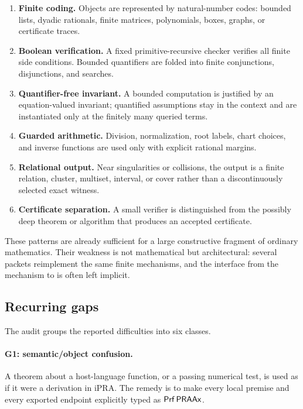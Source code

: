 \begin{enumerate}[label=\textbf{P\arabic*.}]
\item \textbf{Finite coding.}  Objects are represented by natural-number codes:
      bounded lists, dyadic rationals, finite matrices, polynomials, boxes,
      graphs, or certificate traces.
\item \textbf{Boolean verification.}  A fixed primitive-recursive checker
      verifies all finite side conditions.  Bounded quantifiers are folded into
      finite conjunctions, disjunctions, and searches.
\item \textbf{Quantifier-free invariant.}  A bounded computation is justified
      by an equation-valued invariant; quantified assumptions stay in the
      context and are instantiated only at the finitely many queried terms.
\item \textbf{Guarded arithmetic.}  Division, normalization, root labels,
      chart choices, and inverse functions are used only with explicit rational
      margins.
\item \textbf{Relational output.}  Near singularities or collisions, the output
      is a finite relation, cluster, multiset, interval, or cover rather than a
      discontinuously selected exact witness.
\item \textbf{Certificate separation.}  A small verifier is distinguished from
      the possibly deep theorem or algorithm that produces an accepted
      certificate.
\end{enumerate}

These patterns are already sufficient for a large constructive fragment of
ordinary mathematics.  Their weakness is not mathematical but architectural:
several packets reimplement the same finite mechanisms, and the interface from
the mechanism to  is often left implicit.

\subsection{Recurring gaps}

The audit groups the reported difficulties into six classes.

\paragraph{G1: semantic/object confusion.}
A theorem about a host-language function, or a passing numerical test, is used
as if it were a derivation in iPRA.  The remedy is to make every local premise
and every exported endpoint explicitly typed as \(\mathsf{Prf}\,\mathsf{PRAAx}\).

